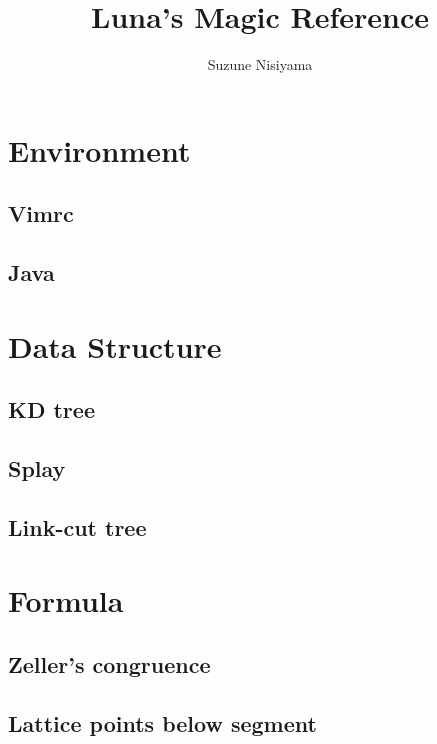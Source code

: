 \documentclass[titlepage, a4paper,10pt]{article}
\title{Luna's Magic Reference}
\author{Suzune Nisiyama}
\date{\today\\ \vspace{100pt} \noindent\rule{\textwidth}{1pt}\\ \vspace{100pt} \normalsize\begin{raggedright}\end{raggedright}}
\begin{document}
	\maketitle
	\begin{multicols}{2}
		\setcounter{tocdepth}{2}
		\begingroup
		\let\cleardoublepage\relax
		\let\clearpage\relax
		\tableofcontents
		\newpage
		\begin{spacing}{0.6}
		\section{Environment}
			\subsection{Vimrc}
				
			\subsection{Java}
				
		\section{Data Structure}
			\subsection{KD tree}
				
			\subsection{Splay}
				
			\subsection{Link-cut tree}
				
		\section{Formula}
			\subsection{Zeller’s congruence}
				
			\subsection{Lattice points below segment}
				

\end{spacing}
\end{multicols}
\end{document}

